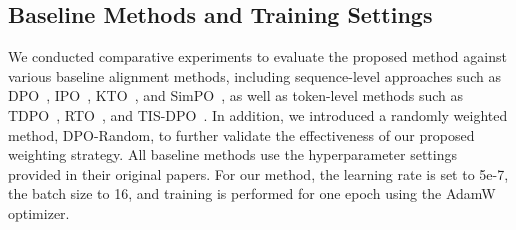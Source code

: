 

\subsection{Baseline Methods and Training Settings}
We conducted comparative experiments to evaluate the proposed method against various baseline alignment methods, including sequence-level approaches such as DPO~\cite{rafailov2023direct}, IPO~\cite{azar2024general}, KTO~\cite{ethayarajh2024kto}, and SimPO~\cite{meng2024simpo}, as well as token-level methods such as TDPO~\cite{zeng2024token}, RTO~\cite{zhong2024dpo}, and TIS-DPO~\cite{liu2024tis}. In addition, we introduced a randomly weighted method, DPO-Random, to further validate the effectiveness of our proposed weighting strategy. All baseline methods use the hyperparameter settings provided in their original papers. For our method, the learning rate is set to 5e-7, the batch size to 16, and training is performed for one epoch using the AdamW optimizer.


